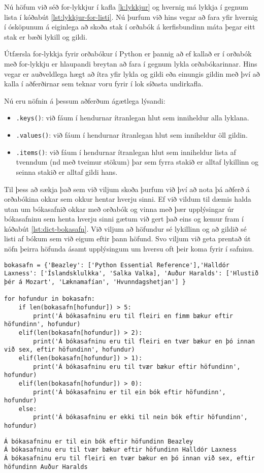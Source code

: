 Nú höfum við séð for-lykkjur í kafla \ref{k:lykkjur} og hvernig má lykkja í gegnum lista í kóðabút \ref{lst:lykkjur-for-listi}.
Nú þurfum við hins vegar að fara yfir hvernig í ósköpunum á eiginlega að skoða stak í orðabók á kerfisbundinn máta þegar eitt stak er bæði lykill og gildi.

Útfærsla for-lykkja fyrir orðabókur í Python er þannig að ef kallað er í orðabók með for-lykkju er hlaupandi breytan að fara í gegnum lykla orðabókarinnar.
Hins vegar er auðveldlega hægt að ítra yfir lykla og gildi eða einungis gildin með því að kalla í aðferðirnar sem teknar voru fyrir í lok síðasta undirkafla.

Nú eru nöfnin á þessum aðferðum ágætlega lýsandi:

\begin{itemize}
	\item \texttt{.keys()}: við fáum í hendurnar ítranlegan hlut sem inniheldur alla lyklana.
	\item \texttt{.values()}: við fáum í hendurnar ítranlegan hlut sem inniheldur öll gildin.
	\item \texttt{.items()}: við fáum í hendurnar ítranlegan hlut sem inniheldur lista af tvenndum (nd með tveimur stökum) þar sem fyrra stakið er alltaf lykillinn og seinna stakið er alltaf gildi hans.
\end{itemize}

Til þess að sækja það sem við viljum skoða þurfum við því að nota þá aðferð á orðabókina okkar sem okkur hentar hverju sinni.
Ef við vildum til dæmis halda utan um bókasafnið okkar með orðabók og vinna með þær upplýsingar úr bókasafninu sem henta hverju sinni gætum við gert það eins og kemur fram í kóðabút \ref{lst:dict-bokasafn}.
Við viljum að höfundur sé lykillinn og að gildið sé listi af bókum sem við eigum eftir þann höfund.
Svo viljum við geta prentað út nöfn þeirra höfunda ásamt upplýsingum um hversu oft þeir koma fyrir í safninu.

\begin{lstlisting}[caption=Ítrað í gegnum orðabók, label=lst:dict-bokasafn]
bokasafn = {'Beazley': ['Python Essential Reference'],'Halldór Laxness': ['Íslandsklulkka', 'Salka Valka], 'Auður Haralds': ['Hlustið þér á Mozart', 'Læknamafían', 'Hvunndagshetjan'] }

for hofundur in bokasafn:
	if len(bokasafn[hofundur]) > 5:
		print('Á bókasafninu eru til fleiri en fimm bækur eftir höfundinn', hofundur)
	elif(len(bokasafn[hofundur]) > 2):
		print('Á bókasafninu eru til fleiri en tvær bækur en þó innan við sex, eftir höfundinn', hofundur)
	elif(len(bokasafn[hofundur]) > 1):
		print('Á bókasafninu eru til tvær bækur eftir höfundinn', hofundur)
	elif(len(bokasafn[hofundur]) > 0):
		print('Á bókasafninu er til ein bók eftir höfundinn', hofundur)
	else:
		print('Á bókasafninu er ekki til nein bók eftir höfundinn', hofundur)
\end{lstlisting}
\lstset{style=uttak}
\begin{lstlisting}
Á bókasafninu er til ein bók eftir höfundinn Beazley
Á bókasafninu eru til tvær bækur eftir höfundinn Halldór Laxness
Á bókasafninu eru til fleiri en tvær bækur en þó innan við sex, eftir höfundinn Auður Haralds
\end{lstlisting}
\lstset{style=venjulegt}

